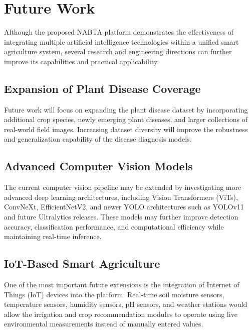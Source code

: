 \section{Future Work}
\label{sec:future_work}

Although the proposed NABTA platform demonstrates the effectiveness of integrating multiple artificial intelligence technologies within a unified smart agriculture system, several research and engineering directions can further improve its capabilities and practical applicability.

\subsection{Expansion of Plant Disease Coverage}
\label{subsec:fw_dataset}

Future work will focus on expanding the plant disease dataset by incorporating additional crop species, newly emerging plant diseases, and larger collections of real-world field images. Increasing dataset diversity will improve the robustness and generalization capability of the disease diagnosis models.

\subsection{Advanced Computer Vision Models}
\label{subsec:fw_cv}

The current computer vision pipeline may be extended by investigating more advanced deep learning architectures, including Vision Transformers (ViTs), ConvNeXt, EfficientNetV2, and newer YOLO architectures such as YOLOv11 and future Ultralytics releases. These models may further improve detection accuracy, classification performance, and computational efficiency while maintaining real-time inference.

\subsection{IoT-Based Smart Agriculture}
\label{subsec:fw_iot}

One of the most important future extensions is the integration of Internet of Things (IoT) devices into the platform. Real-time soil moisture sensors, temperature sensors, humidity sensors, pH sensors, and weather stations would allow the irrigation and crop recommendation modules to operate using live environmental measurements instead of manually entered values.

